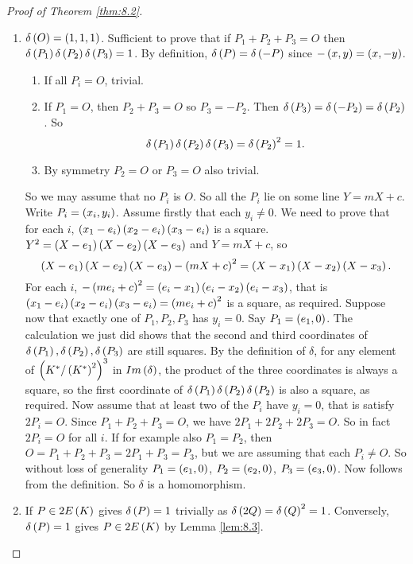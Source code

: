 \begin{proof}[Proof of Theorem \ref{thm:8.2}]
\hfill
\begin{enumerate}
\item $ \delta\left( O \right) = \left( 1, 1, 1 \right) $. Sufficient to prove that if $ P_1 + P_2 + P_3 = O $ then $ \delta\left( P_1 \right)\delta\left( P_2 \right)\delta\left( P_3 \right) = 1 $. By definition, $ \delta\left( P \right) = \delta\left( -P \right) $ since $ -\left( x, y \right) = \left( x, -y \right) $.
\begin{enumerate}
\item If all $ P_i = O $, trivial.
\item If $ P_1 = O $, then $ P_2 + P_3 = O $ so $ P_3 = -P_2 $. Then $ \delta\left( P_3 \right) = \delta\left( -P_2 \right) = \delta\left( P_2 \right) $. So
$$ \delta\left( P_1 \right)\delta\left( P_2 \right)\delta\left( P_3 \right) = \delta\left( P_2 \right)^2 = 1. $$
\item By symmetry $ P_2 = O $ or $ P_3 = O $ also trivial.
\end{enumerate}
So we may assume that no $ P_i $ is $ O $. So all the $ P_i $ lie on some line $ Y = mX + c $. Write $ P_i = \left( x_i, y_i \right) $. Assume firstly that each $ y_i \ne 0 $. We need to prove that for each $ i $, $ \left( x_1 - e_i \right)\left( x_2 - e_i \right)\left( x_3 - e_i \right) $ is a square. $ Y^2 = \left( X - e_1 \right)\left( X - e_2 \right)\left( X - e_3 \right) $ and $ Y = mX + c $, so
$$ \left( X - e_1 \right)\left( X - e_2 \right)\left( X - e_3 \right) - \left( mX + c \right)^2 = \left( X - x_1 \right)\left( X - x_2 \right)\left( X - x_3 \right). $$
For each $ i $, $ -\left( me_i + c \right)^2 = \left( e_i - x_1 \right)\left( e_i - x_2 \right)\left( e_i - x_3 \right) $, that is $ \left( x_1 - e_i \right)\left( x_2 - e_i \right)\left( x_3 - e_i \right) = \left( me_i + c \right)^2 $ is a square, as required. Suppose now that exactly one of $ P_1, P_2, P_3 $ has $ y_i = 0 $. Say $ P_1 = \left( e_1, 0 \right) $. The calculation we just did shows that the second and third coordinates of $ \delta\left( P_1 \right), \delta\left( P_2 \right), \delta\left( P_3 \right) $ are still squares. By the definition of $ \delta $, for any element of $ \left( K^* / \left( K^* \right)^2 \right)^3 $ in $ Im\left( \delta \right) $, the product of the three coordinates is always a square, so the first coordinate of $ \delta\left( P_1 \right)\delta\left( P_2 \right)\delta\left( P_2 \right) $ is also a square, as required. Now assume that at least two of the $ P_i $ have $ y_i = 0 $, that is satisfy $ 2P_i = O $. Since $ P_1 + P_2 + P_3 = O $, we have $ 2P_1 + 2P_2 + 2P_3 = O $. So in fact $ 2P_i = O $ for all $ i $. If for example also $ P_1 = P_2 $, then $ O = P_1 + P_2 + P_3 = 2P_1 + P_3 = P_3 $, but we are assuming that each $ P_i \ne O $. So without loss of generality $ P_1 = \left( e_1, 0 \right) $, $ P_2 = \left( e_2, 0 \right) $, $ P_3 = \left( e_3, 0 \right) $. Now follows from the definition. So $ \delta $ is a homomorphism.
\item If $ P \in 2E\left( K \right) $ gives $ \delta\left( P \right) = 1 $ trivially as $ \delta\left( 2Q \right) = \delta\left( Q \right)^2 = 1 $. Conversely, $ \delta\left( P \right) = 1 $ gives $ P \in 2E\left( K \right) $ by Lemma \ref{lem:8.3}.
\end{enumerate}
\end{proof}

